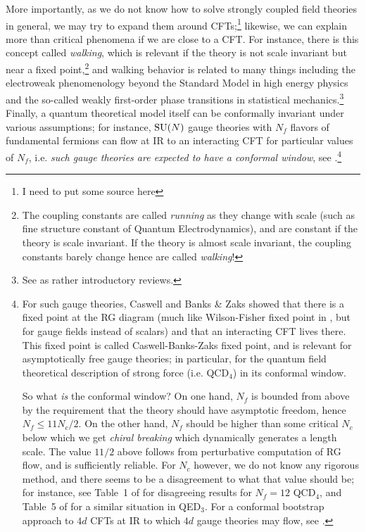\documentclass[12pt]{article}
\newcommand\draftnote[1]{{\color{blue} #1}}
\numberwithin{equation}{section}
\begin{document}
More importantly, as we do not know how to solve strongly coupled field theories in general, we may try to expand them around CFTs;\footnote{\draftnote{I need to put some source here}} likewise, we can explain more than critical phenomena if we are close to a CFT. For instance, there is this concept called \emph{walking}, which is relevant if the theory is not scale invariant but near a fixed point,\footnote{The coupling constants are called \emph{running} as they change with scale (such as fine structure constant of Quantum Electrodynamics), and are constant if the theory is scale invariant. If the theory is almost scale invariant, the coupling constants barely change hence are called \emph{walking}!} and walking behavior is related to many things including  the electroweak phenomenology beyond the Standard Model in high energy physics and the so-called weakly first-order phase transitions in statistical mechanics.\footnote{See \cite{Gorbenko:2018ncu,Gorbenko:2018dtm} as rather introductory reviews.} Finally, a quantum theoretical model itself can be conformally invariant under various assumptions; for instance, $\mathrm{SU}(N)$ gauge theories with $N_f$ flavors of fundamental fermions can flow at IR to an interacting CFT for particular values of $N_f$, i.e. \emph{such gauge theories are expected to have a conformal window}, see \figref{\ref{fig: conformal_gauge}}.\footnote{For such gauge theories, Caswell \cite{Caswell:1974gg} and Banks \& Zaks \cite{Banks:1981nn} showed that there is a fixed point at the RG diagram (much like Wilson-Fisher fixed point in \figref{\ref{fig: Wilson-fisher}}, but for gauge fields instead of scalars) and that an interacting CFT lives there. This fixed point is called Caswell-Banks-Zaks fixed point, and is relevant for asymptotically free gauge theories; in particular, for the quantum field theoretical description of strong force (i.e. QCD$_4$) in its conformal window.

So what \emph{is} the conformal window? On one hand, $N_f$ is bounded from above by the requirement that the theory should have asymptotic freedom, hence $N_f\le 11N_c/2$. On the other hand, $N_f$ should be higher than some critical $N_c$ below which we get \emph{chiral breaking} which dynamically generates a length scale. The value $11/2$ above follows from perturbative computation of RG flow, and is sufficiently reliable. For $N_c$ however, we do not know any rigorous method\footnotemark, and there seems to be a disagreement to what that value should be; for instance, see Table~1 of \cite{DeGrand:2015zxa} for disagreeing results for $N_f=12$ QCD$_4$, and Table~5 of \cite{Gukov:2016tnp} for a similar situation in QED$_3$. For a conformal bootstrap approach to $4d$ CFTs at IR to which $4d$ gauge theories may flow, see \cite{Karateev:2019pvw}.

}
\end{document}
